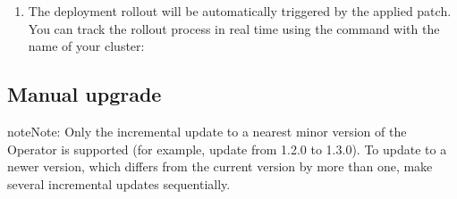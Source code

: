 \documentclass[letterpaper,10pt,english]{sphinxmanual}
\begin{document}
\begin{enumerate}
\item {} 
The deployment rollout will be automatically triggered by the applied patch.
You can track the rollout process in real time using the
 command with the name of your cluster:

\begin{sphinxVerbatim}[commandchars=\\\{\}]
    
\end{sphinxVerbatim}

\end{enumerate}


\subsection{Manual upgrade}
\label{\detokenize{update:manual-upgrade}}\label{\detokenize{update:operator-update-manual-updates}}
\begin{sphinxadmonition}{note}{Note:}
Only the incremental update to a nearest minor version of the Operator
is supported (for example, update from 1.2.0 to 1.3.0).
To update to a newer version, which differs from the current version by more
than one, make several incremental updates sequentially.
\end{sphinxadmonition}
\end{document}
